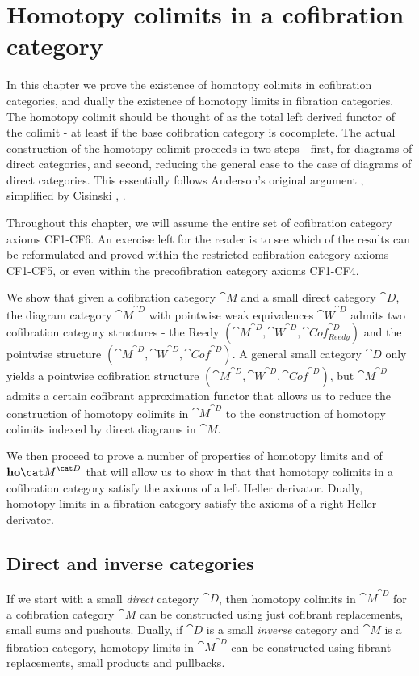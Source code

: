 \chapter{Homotopy colimits in a cofibration category}
\label{chap:limcolimcofinal}

In this chapter we prove the existence of homotopy colimits in cofibration categories, and dually the existence of homotopy limits in fibration categories. The homotopy colimit should be thought of as the total left derived functor of the colimit - at least if the base cofibration category is cocomplete. The actual construction of the homotopy colimit proceeds in two steps - first, for diagrams of direct categories, and second, reducing the general case to the case of diagrams of direct categories. This essentially follows Anderson's original argument \cite{Anderson1}, simplified by Cisinski \cite{Cisinski2}, \cite{Cisinski4}.

Throughout this chapter, we will assume the entire set of cofibration category axioms CF1-CF6. An exercise left for the reader is to see which of the results can be reformulated and proved within the restricted cofibration category axioms CF1-CF5, or even within the precofibration category axioms CF1-CF4.

We show that given a cofibration category ${\cat M}$ and a small direct category ${\cat D}$, the diagram category ${\cat M}^{\cat D}$ with pointwise weak equivalences ${\cat W}^{\cat D}$ admits two cofibration category structures - the Reedy $({\cat M}^{\cat D}, {\cat W}^{\cat D}, {\cat Cof}^{\cat D}_{Reedy})$ and the pointwise structure $({\cat M}^{\cat D}, {\cat W}^{\cat D}, {\cat Cof}^{\cat D})$. A general small category ${\cat D}$ only yields a pointwise cofibration structure $({\cat M}^{\cat D}, {\cat W}^{\cat D}, {\cat Cof}^{\cat D})$, but ${\cat M}^{\cat D}$ admits a certain cofibrant approximation functor that allows us to reduce the construction of homotopy colimits in ${\cat M}^{\cat D}$ to the construction of homotopy colimits indexed by direct diagrams in ${\cat M}$.

We then proceed to prove a number of properties of homotopy limits and of ${\bf ho}{\cat M}^{\cat D}$ that will allow us to show in  that that homotopy colimits in a cofibration category satisfy the axioms of a left Heller derivator. Dually, homotopy limits in a fibration category satisfy the axioms of a right Heller derivator.

\section{Direct and inverse categories}
\label{sec:catdirinv}
If we start with a small {\it direct} category ${\cat D}$, then homotopy colimits in ${\cat M}^{\cat D}$ for a cofibration category ${\cat M}$ can be constructed using just cofibrant replacements, small sums and pushouts. Dually, if ${\cat D}$ is a small {\it inverse} category and ${\cat M}$ is a fibration category, homotopy limits in ${\cat M}^{\cat D}$ can be constructed using fibrant replacements, small products and pullbacks.

